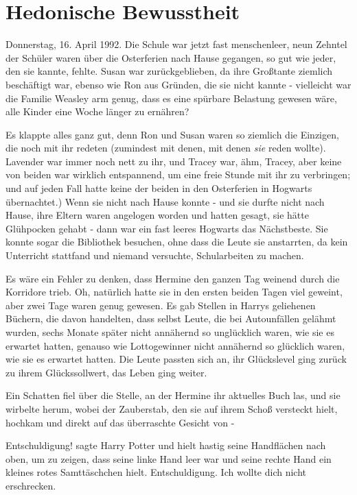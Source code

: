 \chapter{Hedonische Bewusstheit}

Donnerstag, 16. April 1992. Die Schule war jetzt fast menschenleer, neun Zehntel
der Schüler waren über die Osterferien nach Hause gegangen, so gut wie jeder,
den sie kannte, fehlte. Susan war zurückgeblieben, da ihre Großtante ziemlich
beschäftigt war, ebenso wie Ron aus Gründen, die sie nicht kannte - vielleicht
war die Familie Weasley arm genug, dass es eine spürbare Belastung gewesen wäre,
alle Kinder eine Woche länger zu ernähren?

Es klappte alles ganz gut, denn Ron und Susan waren so ziemlich die Einzigen,
die noch mit ihr redeten (zumindest mit denen, mit denen \emph{sie} reden
wollte). Lavender war immer noch nett zu ihr, und Tracey war, ähm, Tracey, aber
keine von beiden war wirklich entspannend, um eine freie Stunde mit ihr zu
verbringen; und auf jeden Fall hatte keine der beiden in den Osterferien in
Hogwarts übernachtet.) Wenn sie nicht nach Hause konnte - und sie durfte nicht
nach Hause, ihre Eltern waren angelogen worden und hatten gesagt, sie hätte
Glühpocken gehabt - dann war ein fast leeres Hogwarts das Nächstbeste. Sie
konnte sogar die Bibliothek besuchen, ohne dass die Leute sie anstarrten, da
kein Unterricht stattfand und niemand versuchte, Schularbeiten zu machen.

Es wäre ein Fehler zu denken, dass Hermine den ganzen Tag weinend durch die
Korridore trieb. Oh, natürlich hatte sie in den ersten beiden Tagen viel
geweint, aber zwei Tage waren genug gewesen. Es gab Stellen in Harrys geliehenen
Büchern, die davon handelten, dass selbst Leute, die bei Autounfällen gelähmt
wurden, sechs Monate später nicht annähernd so unglücklich waren, wie sie es
erwartet hatten, genauso wie Lottogewinner nicht annähernd so glücklich waren,
wie sie es erwartet hatten. Die Leute passten sich an, ihr Glückslevel ging
zurück zu ihrem Glückssollwert, das Leben ging weiter.

Ein Schatten fiel über die Stelle, an der Hermine ihr aktuelles Buch las, und
sie wirbelte herum, wobei der Zauberstab, den sie auf ihrem Schoß versteckt
hielt, hochkam und direkt auf das überraschte Gesicht von -

\glqq Entschuldigung!\grqq{} sagte Harry Potter und hielt hastig seine
Handflächen nach oben, um zu zeigen, dass seine linke Hand leer war und seine
rechte Hand ein kleines rotes Samttäschchen hielt. \glqq Entschuldigung. Ich
wollte dich nicht erschrecken.\grqq{}

